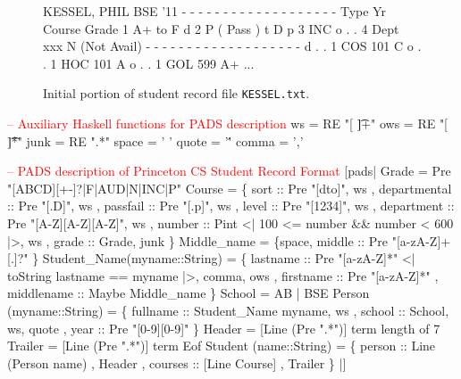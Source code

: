 
\begin{figure}
\begin{code}
KESSEL, PHIL	   BSE   '11
- - - - - - - - - - - - - - - - - - -
Type    Yr  Course     Grade
         1             A+ to F
d        2             P  (  Pass )
t  D  p  3             INC
o  .  .  4  Dept  xxx  N  (Not Avail)
- - - - - - - - - - - - - - - - - - -
d  .  .  1  COS   101  C
o  .  .  1  HOC   101  A
o  .  .  1  GOL   599  A+
...
\end{code}
\caption{Initial portion of student record file {\tt KESSEL.txt}.}
\label{fig:student-file-example}
\end{figure}

\begin{code}
\textcolor{red}{-- Auxiliary Haskell functions for PADS description}
ws   = RE "[ \t]+"
ows  = RE "[ \t]*"
junk = RE ".*"
space = ' '
quote = '\''
comma = ','
\end{code}

\begin{code}
\textcolor{red}{-- PADS description of Princeton CS Student Record Format}
[pads| 
   Grade = Pre "[ABCD][+-]?|F|AUD|N|INC|P"
\mbox{}
   Course = 
    \{ sort         :: Pre "[dto]",           ws
    , departmental :: Pre "[.D]",            ws
    , passfail     :: Pre "[.p]",            ws
    , level        :: Pre "[1234]",          ws
    , department   :: Pre "[A-Z][A-Z][A-Z]", ws
    , number       :: Pint  <| 100 <= number && number < 600 |>, ws
    , grade        :: Grade,                 junk                               
    \} 
\mbox{}
   Middle_name = \{space, middle :: Pre "[a-zA-Z]+[.]?" \}    
\mbox{} 
   Student_Name(myname::String) = 
    \{ lastname   :: Pre "[a-zA-Z]*"   <| toString lastname ==  myname |>,  comma, ows     
    , firstname  :: Pre "[a-zA-Z]*" 
    , middlename :: Maybe Middle_name
    \}
\mbox{}
   School = AB | BSE
\mbox{}
   Person (myname::String) =
    \{ fullname   :: Student_Name myname,    ws
    , school     :: School,                 ws, quote
    , year       :: Pre "[0-9][0-9]"
    \}
\mbox{}
   Header  = [Line (Pre ".*")]  term length of 7 
   Trailer = [Line (Pre ".*")]  term Eof 
   Student (name::String) = 
    \{ person  :: Line (Person name)
    , Header  
    , courses :: [Line Course]
    , Trailer
    \}
|]
\end{code}

